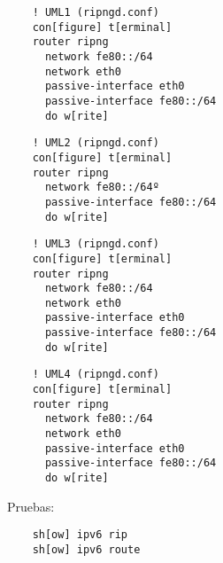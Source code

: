   \begin{verbatim}
    ! UML1 (ripngd.conf)
    con[figure] t[erminal]
    router ripng
      network fe80::/64
      network eth0
      passive-interface eth0
      passive-interface fe80::/64
      do w[rite]
  \end{verbatim}
  
  \begin{verbatim}
    ! UML2 (ripngd.conf)
    con[figure] t[erminal]
    router ripng
      network fe80::/64º
      passive-interface fe80::/64
      do w[rite]
  \end{verbatim}
  
  \begin{verbatim}
    ! UML3 (ripngd.conf)
    con[figure] t[erminal]
    router ripng
      network fe80::/64
      network eth0
      passive-interface eth0
      passive-interface fe80::/64
      do w[rite]
  \end{verbatim}
  
  \begin{verbatim}
    ! UML4 (ripngd.conf)
    con[figure] t[erminal]
    router ripng
      network fe80::/64
      network eth0
      passive-interface eth0
      passive-interface fe80::/64
      do w[rite]
  \end{verbatim}
  
  Pruebas:
  \begin{verbatim}
    sh[ow] ipv6 rip
    sh[ow] ipv6 route
  \end{verbatim}